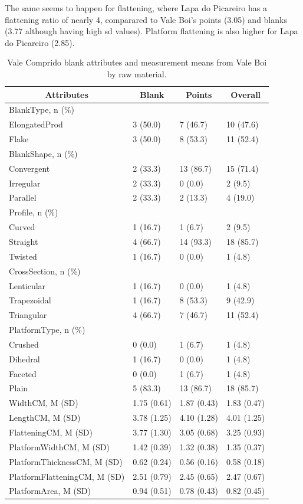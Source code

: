 \documentclass[12pt,twoside]{reedthesis}
\begin{document}
The same seems to happen for flattening, where Lapa do Picareiro has a flattening ratio of nearly 4, comparared to Vale Boi's points (3.05) and blanks (3.77 although having high sd values). Platform flattening is also higher for Lapa do Picareiro (2.85).
\begin{table}

\caption{\label{tab:VCvb}Vale Comprido blank attributes and measurement means from Vale Boi by raw material.}
\centering
\begin{tabular}[t]{llll}
\toprule
\multicolumn{1}{c}{\textbf{Attributes}} & \multicolumn{1}{c}{\textbf{Blank}} & \multicolumn{1}{c}{\textbf{Points}} & \multicolumn{1}{c}{\textbf{Overall}}\\
\midrule
BlankType, n (\%) &  &  & \\
ElongatedProd & 3 (50.0) & 7 (46.7) & 10 (47.6)\\
Flake & 3 (50.0) & 8 (53.3) & 11 (52.4)\\
BlankShape, n (\%) &  &  & \\
Convergent & 2 (33.3) & 13 (86.7) & 15 (71.4)\\
\addlinespace
Irregular & 2 (33.3) & 0 (0.0) & 2 (9.5)\\
Parallel & 2 (33.3) & 2 (13.3) & 4 (19.0)\\
Profile, n (\%) &  &  & \\
Curved & 1 (16.7) & 1 (6.7) & 2 (9.5)\\
Straight & 4 (66.7) & 14 (93.3) & 18 (85.7)\\
\addlinespace
Twisted & 1 (16.7) & 0 (0.0) & 1 (4.8)\\
CrossSection, n (\%) &  &  & \\
Lenticular & 1 (16.7) & 0 (0.0) & 1 (4.8)\\
Trapezoidal & 1 (16.7) & 8 (53.3) & 9 (42.9)\\
Triangular & 4 (66.7) & 7 (46.7) & 11 (52.4)\\
\addlinespace
PlatformType, n (\%) &  &  & \\
Crushed & 0 (0.0) & 1 (6.7) & 1 (4.8)\\
Dihedral & 1 (16.7) & 0 (0.0) & 1 (4.8)\\
Faceted & 0 (0.0) & 1 (6.7) & 1 (4.8)\\
Plain & 5 (83.3) & 13 (86.7) & 18 (85.7)\\
\addlinespace
WidthCM, M (SD) & 1.75 (0.61) & 1.87 (0.43) & 1.83 (0.47)\\
LengthCM, M (SD) & 3.78 (1.25) & 4.10 (1.28) & 4.01 (1.25)\\
FlatteningCM, M (SD) & 3.77 (1.30) & 3.05 (0.68) & 3.25 (0.93)\\
PlatformWidthCM, M (SD) & 1.42 (0.39) & 1.32 (0.38) & 1.35 (0.37)\\
PlatformThicknessCM, M (SD) & 0.62 (0.24) & 0.56 (0.16) & 0.58 (0.18)\\
\addlinespace
PlatformFlatteningCM, M (SD) & 2.51 (0.79) & 2.45 (0.65) & 2.47 (0.67)\\
PlatformArea, M (SD) & 0.94 (0.51) & 0.78 (0.43) & 0.82 (0.45)\\
\bottomrule
\end{tabular}
\end{table}
\end{document}
